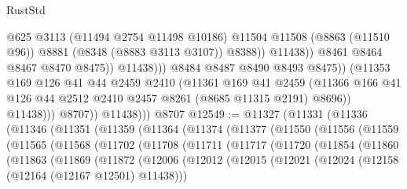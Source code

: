 \begin{lexlean}{RustStd}
\begin{coremodule}
                                        @625
                                        @3113
                                        (@11494 @2754 @11498 @10186)
                                        @11504
                                        @11508
                                        (@8863 (@11510 @96))
                                        @8881
                                        (@8348 (@8883 @3113 @3107))
                                        @8388))
                                    @11438))
                                @8461
                                @8464
                                @8467
                                @8470
                                @8475))
                            @11438)))
                      @8484
                      @8487
                      @8490
                      @8493
                      @8475))
                  (@11353
                    @169
                    @126
                    @41
                    @44
                    @2459
                    @2410
                    (@11361
                      @169
                      @41
                      @2459
                      (@11366 @166 @41 @126 @44 @2512 @2410 @2457 @8261 (@8685 @11315 @2191) @8696))
                    @11438)))
              @8707))
          @11438)))
    @8707
@12549 := @11327
    (@11331
      (@11336
        (@11346
          (@11351
            (@11359
              (@11364
                (@11374
                  (@11377
                    (@11550
                      (@11556
                        (@11559
                          (@11565
                            (@11568
                              (@11702
                                (@11708
                                  (@11711
                                    (@11717
                                      (@11720
                                        (@11854
                                          (@11860
                                            (@11863
                                              (@11869
                                                (@11872
                                                  (@12006
                                                    (@12012
                                                      (@12015
                                                        (@12021
                                                          (@12024
                                                            (@12158
                                                              (@12164 (@12167 @12501) @11438)))

\end{coremodule}
\end{lexlean}
